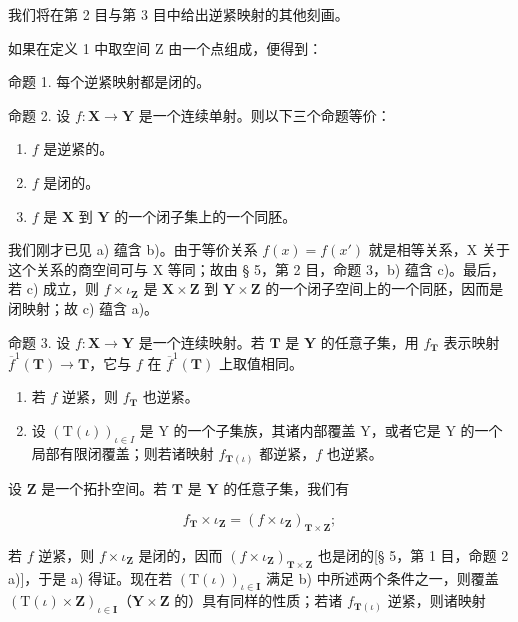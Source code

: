 我们将在第 2 目与第 3 目中给出逆紧映射的其他刻画。

如果在定义 1 中取空间 Z 由一个点组成，便得到：

命题 1. 每个逆紧映射都是闭的。

命题 2. 设 \(f: \mathbf{X} \to \mathbf{Y}\) 是一个连续单射。则以下三个命题等价：

\begin{enumerate}
\def\labelenumi{\alph{enumi})}
\item
  \(f\) 是逆紧的。
\item
  \(f\) 是闭的。
\item
  \(f\) 是 \(\mathbf{X}\) 到 \(\mathbf{Y}\) 的一个闭子集上的一个同胚。
\end{enumerate}

我们刚才已见 a) 蕴含 b)。由于等价关系 \(f(x) = f(x')\) 就是相等关系，X 关于这个关系的商空间可与 X 等同；故由 § 5，第 2 目，命题 3，b) 蕴含 c)。最后，若 c) 成立，则 \(f \times \iota_{\mathbf{Z}}\) 是 \(\mathbf{X} \times \mathbf{Z}\) 到 \(\mathbf{Y} \times \mathbf{Z}\) 的一个闭子空间上的一个同胚，因而是闭映射；故 c) 蕴含 a)。

命题 3. 设 \(f: \mathbf{X} \to \mathbf{Y}\) 是一个连续映射。若 \(\mathbf{T}\) 是 \(\mathbf{Y}\) 的任意子集，用 \(f_{\mathbf{T}}\) 表示映射 \(\overline{f}^{1}(\mathbf{T}) \to \mathbf{T}\)，它与 \(f\) 在 \(\overline{f}^{1}(\mathbf{T})\) 上取值相同。

\begin{enumerate}
\def\labelenumi{\alph{enumi})}
\item
  若 \(f\) 逆紧，则 \(f_{\mathbf{T}}\) 也逆紧。
\item
  设 \((\mathrm{T}(\iota))_{\iota\in I}\) 是 Y 的一个子集族，其诸内部覆盖 Y，或者它是 Y 的一个局部有限闭覆盖；则若诸映射 \(f_{\mathbf{T}(\iota)}\) 都逆紧，\(f\) 也逆紧。
\end{enumerate}

设 \(\mathbf{Z}\) 是一个拓扑空间。若 \(\mathbf{T}\) 是 \(\mathbf{Y}\) 的任意子集，我们有

\[
f _ {\mathbf {T}} \times \iota_ {\mathbf {Z}} = (f \times \iota_ {\mathbf {Z}}) _ {\mathbf {T} \times \mathbf {Z}};
\]

若 \(f\) 逆紧，则 \(f \times \iota_{\mathbf{Z}}\) 是闭的，因而 \((f \times \iota_{\mathbf{Z}})_{\mathbf{T} \times \mathbf{Z}}\) 也是闭的{[}§ 5，第 1 目，命题 2 a){]}，于是 a) 得证。现在若 \((\mathrm{T}(\iota))_{\iota \in \mathbf{I}}\) 满足 b) 中所述两个条件之一，则覆盖 \((\mathrm{T}(\iota) \times \mathbf{Z})_{\iota \in \mathbf{I}}\)（\(\mathbf{Y} \times \mathbf{Z}\) 的）具有同样的性质；若诸 \(f_{\mathbf{T}(\iota)}\) 逆紧，则诸映射

